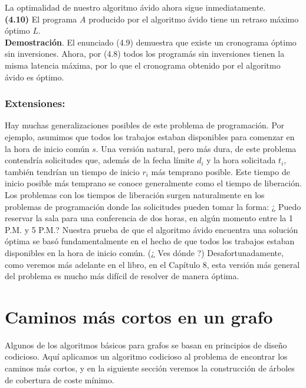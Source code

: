 \documentclass[a4paper, 12pt]{book}
\theoremstyle{dotless}
\begin{document}
La optimalidad de nuestro algoritmo ávido ahora sigue inmediatamente.\\

\textbf{(4.10)} El programa $A$ producido por el algoritmo ávido tiene un retraso máximo óptimo $L$.\\

\textbf{Demostración}. El enunciado (4.9) demuestra que existe un cronograma óptimo sin inversiones. Ahora, por (4.8) todos los programás sin inversiones tienen la misma latencia máxima, por lo que el cronograma obtenido por el algoritmo ávido es óptimo.\\

\subsubsection*{Extensiones:}

Hay muchas generalizaciones posibles de este problema de programación. Por ejemplo, asumimos que todos los trabajos estaban disponibles para comenzar en la hora de inicio común $s$. Una versión natural, pero más dura, de este problema contendría solicitudes que, además de la fecha límite $d_i$ y la hora solicitada $t_i$, también tendrían un tiempo de inicio $r_i$ más temprano posible. Este tiempo de inicio posible más temprano se conoce generalmente como el tiempo de liberación. Los problemas con los tiempos de liberación surgen naturalmente en los problemas de programación donde las solicitudes pueden tomar la forma: ¿ Puedo reservar la sala para una conferencia de dos horas, en algún momento entre la 1 P.M. y 5 P.M.? Nuestra prueba de que el algoritmo ávido encuentra una solución óptima se basó fundamentalmente en el hecho de que todos los trabajos estaban disponibles en la hora de inicio común. (¿ Ves dónde ?) Desafortunadamente, como veremos más adelante en el libro, en el Capítulo 8, esta versión más general del problema es mucho más difícil de resolver de manera óptima.\\


\section{Caminos más cortos en un grafo}


Algunos de los algoritmos básicos para grafos se basan en principios de diseño codicioso. Aquí aplicamos un algoritmo codicioso al problema de encontrar los caminos más cortos, y en la siguiente sección veremos la construcción de árboles de cobertura de coste mínimo.
\end{document}
